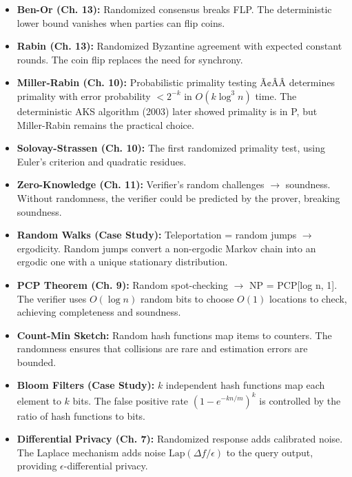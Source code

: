\begin{itemize}
\item \textbf{Ben-Or (Ch. 13):} Randomized consensus breaks FLP. The deterministic lower bound vanishes when parties can flip coins.

\item \textbf{Rabin (Ch. 13):} Randomized Byzantine agreement with expected constant rounds. The coin flip replaces the need for synchrony.

\item \textbf{Miller-Rabin (Ch. 10):} Probabilistic primality testing Ã¢ÂÂ determines primality with error probability $< 2^{-k}$ in $O(k \log^3 n)$ time. The deterministic AKS algorithm (2003) later showed primality is in P, but Miller-Rabin remains the practical choice.

\item \textbf{Solovay-Strassen (Ch. 10):} The first randomized primality test, using Euler's criterion and quadratic residues.

\item \textbf{Zero-Knowledge (Ch. 11):} Verifier's random challenges $\to$ soundness. Without randomness, the verifier could be predicted by the prover, breaking soundness.

\item \textbf{Random Walks (Case Study):} Teleportation = random jumps $\to$ ergodicity. Random jumps convert a non-ergodic Markov chain into an ergodic one with a unique stationary distribution.

\item \textbf{PCP Theorem (Ch. 9):} Random spot-checking $\to$ NP = PCP[log n, 1]. The verifier uses $O(\log n)$ random bits to choose $O(1)$ locations to check, achieving completeness and soundness.

\item \textbf{Count-Min Sketch:} Random hash functions map items to counters. The randomness ensures that collisions are rare and estimation errors are bounded.

\item \textbf{Bloom Filters (Case Study):} $k$ independent hash functions map each element to $k$ bits. The false positive rate $(1 - e^{-kn/m})^k$ is controlled by the ratio of hash functions to bits.

\item \textbf{Differential Privacy (Ch. 7):} Randomized response adds calibrated noise. The Laplace mechanism adds noise $\text{Lap}(\Delta f / \epsilon)$ to the query output, providing $\epsilon$-differential privacy.


\end{itemize}

